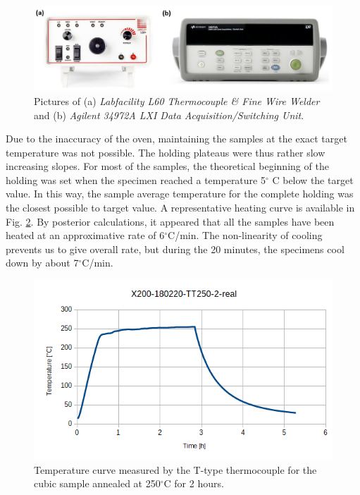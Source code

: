 \begin{figure}[ht]
	\centering
	\includegraphics[scale=0.30]{Images/agilent}
	\decoRule
	\caption[Pictures of (a) \textit{Labfacility L60 Thermocouple \& Fine Wire Welder} and (b) \textit{Agilent 34972A LXI Data Acquisition/Switching Unit}.]{Pictures of (a) \textit{Labfacility L60 Thermocouple \& Fine Wire Welder} and (b) \textit{Agilent 34972A LXI Data Acquisition/Switching Unit}.}
	\label{fig:agilent}
\end{figure}

Due to the inaccuracy of the oven, maintaining the samples at the exact target temperature was not possible. The holding plateaus were thus rather slow increasing slopes. For most of the samples, the theoretical beginning of the holding was set when the specimen reached a temperature 5$^\circ$ C below the target value. In this way, the sample average temperature for the complete holding was the closest possible to target value. A representative heating curve is available in Fig. \ref{fig:TT250-2-curve}. By posterior calculations, it appeared that all the samples have been heated at an approximative rate of 6$^\circ$C/min. The non-linearity of cooling prevents us to give overall rate, but during the 20 minutes, the specimens cool down by about 7$^\circ$C/min. \\

\begin{figure}[ht]
	\centering
	\includegraphics[scale=0.70]{Images/X200-180220-TT250-2-real}
	\decoRule
	\caption[Temperature curve measured by the T-type thermocouple for the cubic sample annealed at 250$^\circ$C for 2 hours.]{Temperature curve measured by the T-type thermocouple for the cubic sample annealed at 250$^\circ$C for 2 hours.}
	\label{fig:TT250-2-curve}
\end{figure}

